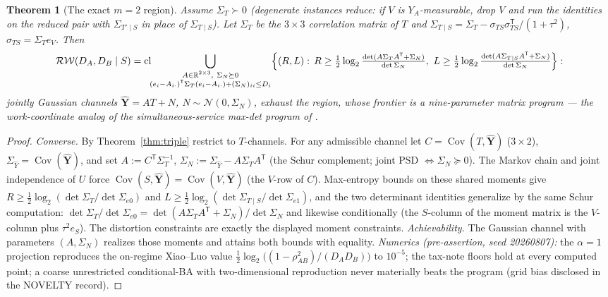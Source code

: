 \documentclass[11pt]{article}
\newtheorem{theorem}{Theorem}\newtheorem{corollary}{Corollary}
\newcommand{\Cov}{\operatorname{Cov}}\newcommand{\hX}{\widehat X}
\begin{document}
\begin{theorem}[The exact $m=2$ region]\label{thm:m2}
Assume $\Sigma_T\succ0$ (degenerate instances reduce: if $V$ is
$Y_A$-measurable, drop $V$ and run the identities on the reduced pair
with $\Sigma_{T'\mid S}$ in place of $\Sigma_{T\mid S}$). Let $\Sigma_T$
be the $3\times3$ correlation matrix of $T$ and
$\Sigma_{T\mid S}=\Sigma_T-\sigma_{TS}\sigma_{TS}^{\mathsf T}/(1+\tau^2)$,
$\sigma_{TS}=\Sigma_T e_V$. Then
\[
\mathcal{RW}(D_A,D_B\mid S)=\operatorname{cl}\!\!
\bigcup_{\substack{A\in\mathbb R^{2\times3},\ \Sigma_N\succeq0\\
(e_i-A_{i\cdot})^{\mathsf T}\Sigma_T(e_i-A_{i\cdot})+(\Sigma_N)_{ii}\le D_i}}
\Bigl\{(R,L):\,
R\ge\tfrac12\log_2\tfrac{\det(A\Sigma_TA^{\mathsf T}+\Sigma_N)}{\det\Sigma_N},\
L\ge\tfrac12\log_2\tfrac{\det(A\Sigma_{T\mid S}A^{\mathsf T}+\Sigma_N)}{\det\Sigma_N}
\Bigr\}:
\]
jointly Gaussian channels $\hat{\mathbf Y}=AT+N$, $N\sim\mathcal N(0,\Sigma_N)$,
exhaust the region, whose frontier is a nine-parameter matrix program ---
the work-coordinate analog of the simultaneous-service max-det program of
\cite{bondtwoobserver}.
\end{theorem}
\begin{proof}
\emph{Converse.} By Theorem~\ref{thm:triple} restrict to $T$-channels.
For any admissible channel let $C=\Cov(T,\hat{\mathbf Y})$ ($3\times2$),
$\Sigma_{\hat Y}=\Cov(\hat{\mathbf Y})$, and set $A:=C^{\mathsf T}\Sigma_T^{-1}$,
$\Sigma_N:=\Sigma_{\hat Y}-A\Sigma_TA^{\mathsf T}$ (the Schur complement;
joint PSD $\Leftrightarrow\Sigma_N\succeq0$). The Markov chain and joint
independence of $U$ force $\Cov(S,\hat{\mathbf Y})=\Cov(V,\hat{\mathbf Y})$
(the $V$-row of $C$). Max-entropy bounds on these shared moments give
$R\ge\tfrac12\log_2(\det\Sigma_T/\det\Sigma_{e0})$ and
$L\ge\tfrac12\log_2(\det\Sigma_{T\mid S}/\det\Sigma_{e1})$, and the two
determinant identities generalize by the same Schur computation:
$\det\Sigma_T/\det\Sigma_{e0}
=\det(A\Sigma_TA^{\mathsf T}+\Sigma_N)/\det\Sigma_N$ and likewise
conditionally (the $S$-column of the moment matrix is the $V$-column plus
$\tau^2e_S$). The distortion constraints are exactly the displayed moment
constraints. \emph{Achievability.} The Gaussian channel with parameters
$(A,\Sigma_N)$ realizes those moments and attains both bounds with
equality. \emph{Numerics (pre-assertion, seed 20260807):} the $\alpha=1$
projection reproduces the on-regime Xiao--Luo value
$\tfrac12\log_2\bigl((1-\rho_{AB}^2)/(D_AD_B)\bigr)$ to $10^{-5}$;
the tax-note floors hold at every computed point; a coarse unrestricted
conditional-BA with two-dimensional reproduction never materially beats
the program (grid bias disclosed in the NOVELTY record).
\end{proof}
\end{document}
